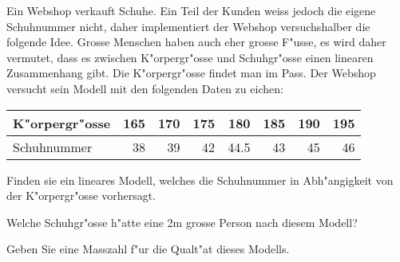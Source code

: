 Ein Webshop verkauft Schuhe.
Ein Teil der Kunden weiss jedoch die eigene Schuhnummer nicht, 
daher implementiert der Webshop versuchshalber die folgende Idee.
Grosse Menschen haben auch eher grosse F"usse, es wird daher vermutet,
dass es zwischen K"orpergr"osse und Schuhgr"osse einen linearen
Zusammenhang gibt. 
Die K"orpergr"osse findet man im Pass.
Der Webshop versucht sein Modell mit den folgenden Daten zu
eichen:
\begin{center}
\begin{tabular}{lrrrrrrr}
K"orpergr"osse&165&170&175&180  &185&190&195\\
\hline
Schuhnummer   & 38& 39& 42& 44.5& 43& 45&46
\end{tabular}
\end{center}
\begin{teilaufgaben}
\item Finden sie ein lineares Modell, welches die Schuhnummer in
Abh"angigkeit von der K"orpergr"osse vorhersagt.
\item Welche Schuhgr"osse h"atte eine 2m grosse Person nach diesem Modell?
\item Geben Sie eine Masszahl f"ur die Qualt"at dieses Modells.
\end{teilaufgaben}

